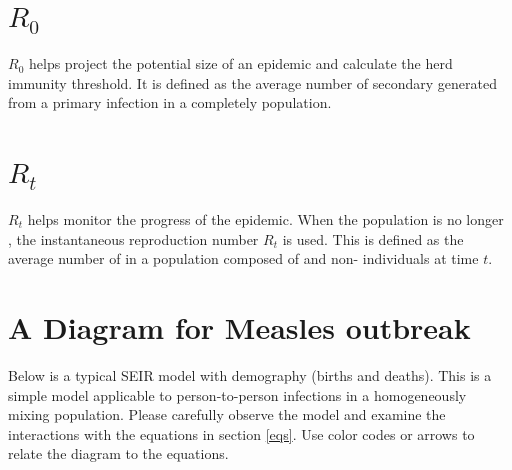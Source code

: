 \documentclass{article}
\begin{document}
\section{\( R_0 \)}
\( R_0 \) helps project the potential
size of an epidemic and calculate the herd immunity threshold.
It is defined as the average number of secondary \underline{\hspace{2cm}} generated from a primary infection in a completely
\underline{\hspace{2.5cm}} population.

\section{\( R_t \)}
\( R_t \)
helps monitor the progress of the epidemic.
When the population is no longer \underline{\hspace{2cm}}, the instantaneous
reproduction number \( R_t \) is used. This is defined as the average number
of \underline{\hspace{3cm}} in a population composed of
\underline{\hspace{2cm}} and non-\underline{\hspace{2cm}} individuals at time \( t \).

\section{A Diagram for Measles outbreak}

Below is a typical SEIR model with demography (births and deaths). This is a simple
model applicable to person-to-person infections in a homogeneously mixing population.
Please carefully observe the model and examine the interactions with the equations
in section \ref{eqs}.  Use color codes or arrows to relate the diagram to the equations.


\begin{center}
\end{center}
\end{document}
